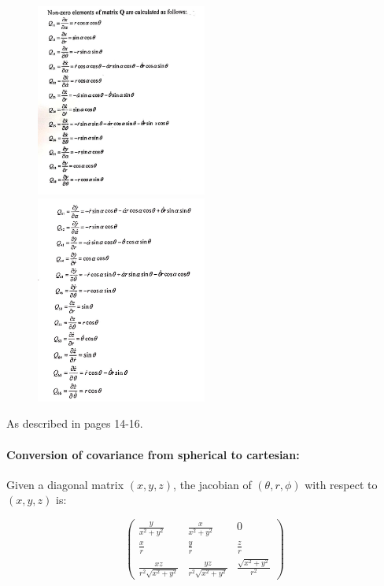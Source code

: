 \documentclass{article}
\begin{document}
\begin{figure}[h]\label{fig:spherical}
\includegraphics[width=0.5\textwidth,height=0.5\textheight,keepaspectratio]{figures/cartesian-covariance1}
\includegraphics[width=0.5\textwidth,height=0.5\textheight,keepaspectratio]{figures/cartesian-covariance2}
\end{figure}

As described in pages 14-16.


\paragraph{Conversion of covariance from spherical to cartesian:}
Given a diagonal matrix $(x,y,z)$, the jacobian of $(\theta, r, \phi)$ with
respect to $(x,y,z)$ is:


\begin{equation}\label{jacobian:position-cartesian}
\begin{pmatrix}
    \frac{y}{x^2+y^2} & \frac{x}{x^2+y^2} & 0
    \\
    \frac{x}{r} & \frac{y}{r} & \frac{z}{r} \\
    \frac{xz}{r^2\sqrt{x^2+y^2}} & \frac{yz}{r^2\sqrt{x^2+y^2}} &
    \frac{\sqrt{x^2+y^2}}{r^2}
  \end{pmatrix}
\end{equation}
\end{document}

